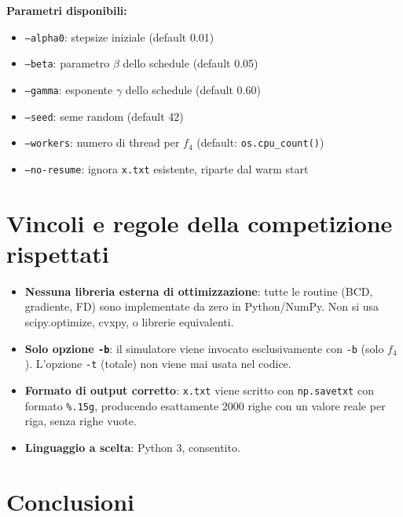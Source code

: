 \documentclass[12pt,a4paper]{article}
\theoremstyle{definition}
\begin{document}
\textbf{Parametri disponibili:}
\begin{itemize}[nosep]
  \item \texttt{--alpha0}: stepsize iniziale (default 0.01)
  \item \texttt{--beta}: parametro $\beta$ dello schedule (default 0.05)
  \item \texttt{--gamma}: esponente $\gamma$ dello schedule (default 0.60)
  \item \texttt{--seed}: seme random (default 42)
  \item \texttt{--workers}: numero di thread per $f_4$ (default: \texttt{os.cpu\_count()})
  \item \texttt{--no-resume}: ignora \texttt{x.txt} esistente, riparte dal warm start
\end{itemize}

\section{Vincoli e regole della competizione rispettati}

\begin{itemize}
  \item \textbf{Nessuna libreria esterna di ottimizzazione}: tutte le routine (BCD, gradiente,
        FD) sono implementate da zero in Python/NumPy. Non si usa scipy.optimize, cvxpy, o
        librerie equivalenti.
  \item \textbf{Solo opzione \texttt{-b}}: il simulatore viene invocato esclusivamente con
        \texttt{-b} (solo $f_4$). L'opzione \texttt{-t} (totale) non viene mai usata nel codice.
  \item \textbf{Formato di output corretto}: \texttt{x.txt} viene scritto con \texttt{np.savetxt}
        con formato \texttt{\%.15g}, producendo esattamente 2000 righe con un valore reale
        per riga, senza righe vuote.
  \item \textbf{Linguaggio a scelta}: Python 3, consentito.
\end{itemize}

\section{Conclusioni}
\end{document}
